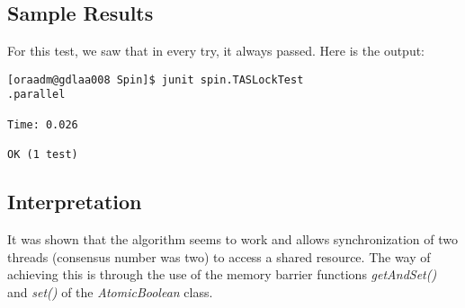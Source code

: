 \subsection{Sample Results}
\par
For this test, we saw that in every try, it always passed. Here is the output:
\par
\begin{verbatim}
[oraadm@gdlaa008 Spin]$ junit spin.TASLockTest
.parallel

Time: 0.026

OK (1 test)
\end{verbatim}
\par
\subsection{Interpretation}
It was shown that the algorithm seems to work and allows synchronization of two
threads (consensus number was two) to access a shared resource. The way of
achieving this is through the use of the memory barrier functions
\textit{getAndSet()} and \textit{set()} of the \textit{AtomicBoolean} class.
